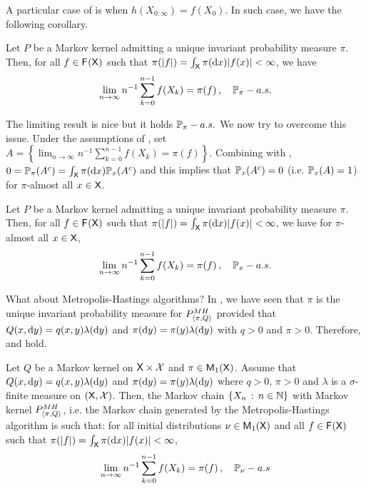 \documentclass[english,graybox,envcountchap,envcountsame,sectrefs,shortlabels]{svmono}
\theoremstyle{style}
\begin{document}
 A particular case of  is when $h(X_{0:\infty})=f(X_{0})$.
In such case, we have the following corollary. 
\begin{corollary}
\label{cor:birk:mrkv:part}Let $P$ be a Markov kernel admitting a
unique invariant probability measure $\pi.$ Then, for all $f\in\mathsf{F_{}}(\mathsf{X})$
such that $\pi(|f|)=\int_{\mathsf{X}}\pi(\mathrm{d} x)|f(x)|<\infty$, we have
\begin{equation}
\lim_{n\to\infty}n^{-1}\sum_{k=0}^{n-1}f(X_{k})=\pi(f)\,,\quad\mathbb{P}_{\pi}-a.s.\label{eq:markov:LLN}
\end{equation}
\end{corollary}
 The limiting result  is nice but it holds
$\mathbb{P}_{\pi}-a.s.$ We now try to overcome this issue. Under the assumptions
of , set $A=\left\{ \lim_{n\to\infty}n^{-1}\sum_{k=0}^{n-1}f(X_{k})=\pi(f)\right\} $.
Combining  with , $0=\mathbb{P}_{\pi}(A^{c})=\int_{\mathsf{X}}\pi(\mathrm{d} x)\mathbb{P}_{x}(A^{c})$
and this implies that $\mathbb{P}_{x}(A^{c})=0$ (i.e. $\mathbb{P}_{x}(A)=1$) for
$\pi$-almost all $x\in\mathsf{X}$.  
\begin{corollary}
\label{cor:birk:mrkv:almost}Let $P$ be a Markov kernel admitting
a unique invariant probability measure $\pi.$ Then, for all $f\in\mathsf{F_{}}(\mathsf{X})$
such that $\pi(|f|)=\int_{\mathsf{X}}\pi(\mathrm{d} x)|f(x)|<\infty$, we have
for $\pi$-almost all $x\in\mathsf{X}$,
\begin{equation}
\lim_{n\to\infty}n^{-1}\sum_{k=0}^{n-1}f(X_{k})=\pi(f)\,,\quad\mathbb{P}_{x}-a.s.\label{eq:lln:almost}
\end{equation}
\end{corollary}


What about Metropolis-Hastings algorithms? In ,
we have seen that $\pi$ is the unique invariant probability measure
for $P_{\langle\pi,Q\rangle}^{MH}$ provided that $Q(x,\mathrm{d} y)=q(x,y)\lambda(\mathrm{d} y)$
and $\pi(\mathrm{d} y)=\pi(y)\lambda(\mathrm{d} y)$ with $q>0$ and $\pi>0$.
Therefore,  and  hold. 

\begin{theorem} \label{thm:lln:hm}
Let $Q$ be a Markov kernel on $\mathsf{X}\times\mathcal{X}$ and $\pi\in\mathsf{M}_{1}(\mathsf{X})$.
Assume that $Q(x,\mathrm{d} y)=q(x,y)\lambda(\mathrm{d} y)$ and $\pi(\mathrm{d} y)=\pi(y)\lambda(\mathrm{d} y)$
where $q>0$, $\pi>0$ and $\lambda$ is a $\sigma$-finite measure
on $(\mathsf{X},\mathcal{X})$. Then, the Markov chain $\left\{ X_{n}\,:\,n\in\mathbb{N}\right\}$
with Markov kernel $P_{\langle\pi,Q\rangle}^{MH}$, i.e. the Markov chain generated
by the Metropolis-Hastings algorithm is such that: for all initial
distributions $\nu\in\mathsf{M}_{1}(\mathsf{X})$ and all $f\in\mathsf{F_{}}(\mathsf{X})$
such that $\pi(|f|)=\int_{\mathsf{X}}\pi(\mathrm{d} x)|f(x)|<\infty$,
\begin{equation}
\lim_{n\to\infty}n^{-1}\sum_{k=0}^{n-1}f(X_{k})=\pi(f)\,,\quad\mathbb{P}_{\nu}-a.s\label{eq:LLN:MH}
\end{equation}
\end{theorem}
\end{document}

